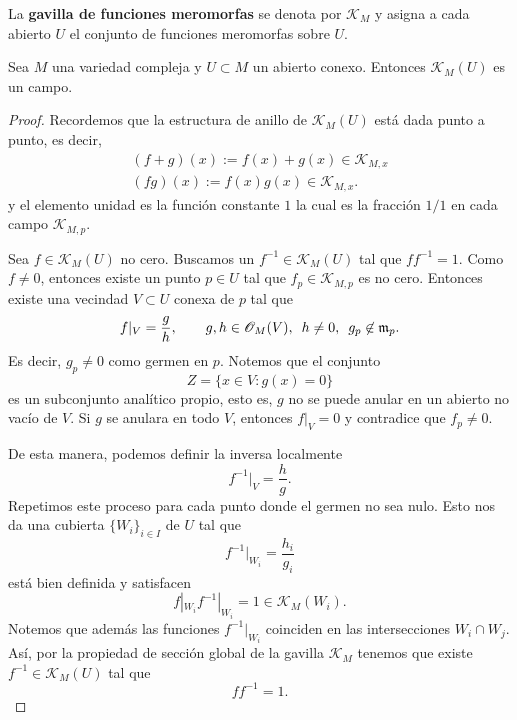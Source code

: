 La \textbf{gavilla de funciones meromorfas} se denota por $\mathcal{K}_{M}$ y asigna a cada abierto $U$ el conjunto de funciones meromorfas sobre $U$.

\begin{propo}\label{campodefunciones}
	Sea $M$ una variedad compleja y $U\subset M$ un abierto conexo. Entonces $\mathcal{K}_{M}(U)$ es un campo.
\end{propo}
\begin{proof}
	Recordemos que la estructura de anillo de $\mathcal{K}_{M}(U)$ está dada punto a punto, es decir,
	\begin{align*}
		(f+g)(x):=f(x)+g(x)\in\mathcal{K}_{M,x}\\
		(fg)(x):=f(x)g(x)\in\mathcal{K}_{M,x}.
	\end{align*}
	y el elemento unidad es la función constante $1$ la cual es la fracción $1/1$ en cada campo $\mathcal{K}_{M,p}$.
	
	Sea $f\in \mathcal{K}_{M}(U)$ no cero. Buscamos un $f^{-1}\in\mathcal{K}_{M}(U)$ tal que $ff^{-1}=1$.
	Como $f\neq 0$, entonces existe un punto $p\in U$ tal que $f_p\in\mathcal{K}_{M,p}$ es no cero. Entonces existe una vecindad $V\subset U$ conexa de $p$ tal que
	\begin{equation*}
		f|_V=\frac gh,\qquad g,h\in\mathscr{O}_M(V),\enspace h\neq 0,\enspace g_p\not\in\mathfrak{m}_p.
	\end{equation*}
	Es decir, $g_p\neq 0$ como germen en $p$. Notemos que el conjunto 
	\begin{equation*}
		Z=\{x\in V:g(x)=0\}
	\end{equation*}
	es un subconjunto analítico propio, esto es, $g$ no se puede anular en un abierto no vacío de $V$. Si $g$ se anulara en todo $V$, entonces $f|_V=0$ y contradice que $f_p\neq 0$.
	
	De esta manera, podemos definir la inversa localmente 
	\begin{equation*}
		f^{-1}|_V=\frac hg.
	\end{equation*} 
	Repetimos este proceso para cada punto donde el germen no sea nulo. Esto nos da una cubierta $\{W_i\}_{i\in I}$ de $U$ tal que
	\begin{equation*}
		f^{-1}|_{W_i}=\frac{h_i}{g_i}
	\end{equation*}
	está bien definida y satisfacen 
	\begin{equation*}
		f|_{W_i}f^{-1}|_{W_i}=1\in\mathcal{K}_M(W_i).
	\end{equation*}
	Notemos que además las funciones $f^{-1}|_{W_i}$ coinciden en las intersecciones $W_i\cap W_j$. Así, por la propiedad de sección global de la gavilla $\mathcal{K}_M$ tenemos que existe $f^{-1}\in \mathcal{K}_{M}(U)$ tal que
	\begin{equation*}
		ff^{-1}=1.
	\end{equation*}
\end{proof}

